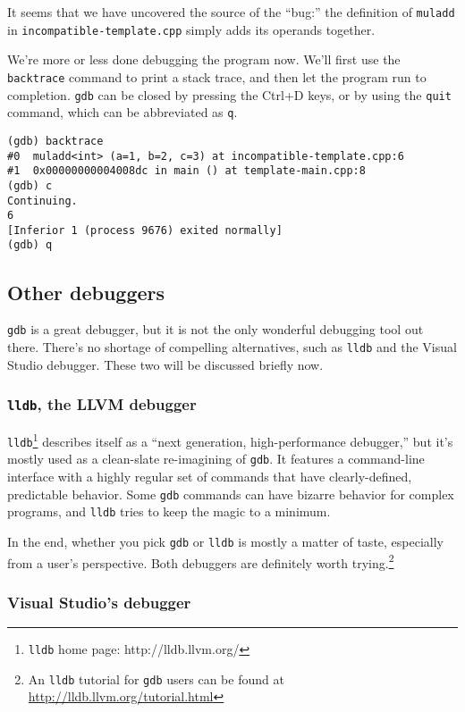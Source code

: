 \documentclass[12pt,a4paper]{article}
\newcommand{\llvm}{LLVM}
\newcommand{\gdb}{\texttt{gdb}}
\newcommand{\lldb}{\texttt{lldb}}
\newcommand{\labelname}[1]{\texttt{#1}}
\newcommand{\functionname}[1]{\labelname{#1}}
\newcommand{\filename}[1]{\texttt{#1}}
\begin{document}
It seems that we have uncovered the source of the ``bug:'' the definition of \functionname{muladd} in \filename{incompatible-template.cpp} simply adds its operands together. 

We're more or less done debugging the program now. We'll first use the \functionname{backtrace} command to print a stack trace, and then let the program run to completion. \gdb{} can be closed by pressing the Ctrl+D keys, or by using the \functionname{quit} command, which can be abbreviated as \functionname{q}.\\

\begin{lstlisting}[caption={running \functionname{backtrace}, followed by \functionname{c} and \functionname{q}}]
(gdb) backtrace
#0  muladd<int> (a=1, b=2, c=3) at incompatible-template.cpp:6
#1  0x00000000004008dc in main () at template-main.cpp:8
(gdb) c
Continuing.
6
[Inferior 1 (process 9676) exited normally]
(gdb) q
\end{lstlisting}

\subsection{Other debuggers}

\gdb{} is a great debugger, but it is not the only wonderful debugging tool out there. There's no shortage of compelling alternatives, such as \lldb{} and the Visual Studio debugger. These two will be discussed briefly now.

\subsubsection{\lldb{}, the \llvm{} debugger}

\lldb{}\footnote{\lldb{} home page: http://lldb.llvm.org/} describes itself as a ``next generation, high-performance debugger,'' but it's mostly used as a clean-slate re-imagining of \gdb{}. It features a command-line interface with a highly regular set of commands that have clearly-defined, predictable behavior. Some \gdb{} commands can have bizarre behavior for complex programs, and \lldb{} tries to keep the magic to a minimum.

In the end, whether you pick \gdb{} or \lldb{} is mostly a matter of taste, especially from a user's perspective. Both debuggers are definitely worth trying.\footnote{An \lldb{} tutorial for \gdb{} users can be found at \url{http://lldb.llvm.org/tutorial.html}}

\subsubsection{Visual Studio's debugger}
\end{document}
